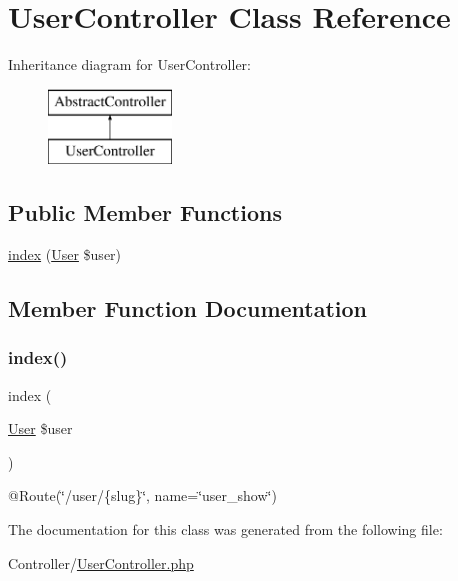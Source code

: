 \hypertarget{class_app_1_1_controller_1_1_user_controller}{}\section{User\+Controller Class Reference}
\label{class_app_1_1_controller_1_1_user_controller}
Inheritance diagram for User\+Controller\+:\begin{figure}[H]
\begin{center}
\leavevmode
\includegraphics[height=2.000000cm]{class_app_1_1_controller_1_1_user_controller}
\end{center}
\end{figure}
\subsection*{Public Member Functions}
\begin{DoxyCompactItemize}
\item 
\mbox{\hyperlink{class_app_1_1_controller_1_1_user_controller_aefb8737608011de583871f62f276992d}{index}} (\mbox{\hyperlink{class_app_1_1_entity_1_1_user}{User}} \$user)
\end{DoxyCompactItemize}


\subsection{Member Function Documentation}
\mbox{\label{class_app_1_1_controller_1_1_user_controller_aefb8737608011de583871f62f276992d}} 
\subsubsection{\texorpdfstring{index()}{index()}}
{\footnotesize\ttfamily index (\begin{DoxyParamCaption}\item[{\mbox{\hyperlink{class_app_1_1_entity_1_1_user}{User}}}]{\$user }\end{DoxyParamCaption})}

@\+Route(\char`\"{}/user/\{slug\}\char`\"{}, name=\char`\"{}user\+\_\+show\char`\"{}) 

The documentation for this class was generated from the following file\+:\begin{DoxyCompactItemize}
\item 
Controller/\mbox{\hyperlink{_user_controller_8php}{User\+Controller.\+php}}\end{DoxyCompactItemize}
